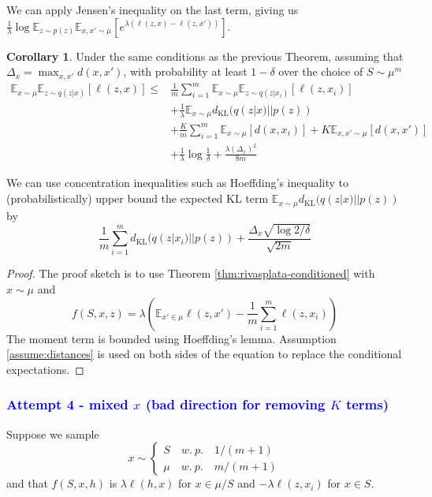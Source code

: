 \documentclass[letterpaper]{article}
\theoremstyle{definition}
\newtheorem{corollary}{Corollary}
\newcommand{\LF}[1]{{\textcolor{blue}{#1}}}
\begin{document}
We can apply Jensen's inequality on the last term, giving us $\frac{1}{\lambda}\log \mathbb{E}_{z\sim p(z)}\mathbb{E}_{x,x'\sim \mu}\left [e^{\lambda(\ell(z,x)-\ell(z,x'))}\right ]$.

\begin{corollary}
    Under the same conditions as the previous Theorem, assuming that $\Delta_x=\max_{x,x'}d(x,x')$, with probability at least $1-\delta$ over the choice of $S\sim \mu^m$
    \begin{equation}
\begin{split}
    \mathbb{E}_{x\sim \mu}\mathbb{E}_{z\sim q(z|x)}\left [\ell(z,x) \right ]\leq &\frac{1}{m}\sum_{i=1}^{m}\mathbb{E}_{x\sim \mu}\mathbb{E}_{z\sim q(z|x_i)}\left [\ell(z,x_{i}) \right ]\\
    &+ \frac{1}{\lambda}\mathbb{E}_{x\sim \mu}d_{\mathrm{KL}}(q(z|x)||p(z)) \\
    & + \frac{K}{m}\sum_{i=1}^{m}\mathbb{E}_{x\sim \mu}\left [d(x,x_i) \right ]+ K\mathbb{E}_{x,x'\sim \mu}\left [d(x,x') \right ]\\ &+\frac{1}{\lambda}\log\frac{1}{\delta} 
    + \frac{\lambda (\Delta_x)^2}{8m}
\end{split}
\end{equation}
\end{corollary}

We can use concentration inequalities such as Hoeffding's inequality to (probabilistically) upper bound the expected KL term $\mathbb{E}_{x\sim \mu}d_{\mathrm{KL}}(q(z|x)||p(z))$ by $$\frac{1}{m}\sum_{i=1}^{m}d_{\mathrm{KL}}(q(z|x_i)||p(z))+\frac{\Delta_x\sqrt{\log2/\delta}}{\sqrt{2m}}$$

\begin{proof}
    The proof sketch is to use Theorem \ref{thm:rivasplata-conditioned} with $x\sim \mu$ and $$f(S,x,z)=\lambda\left (\mathbb{E}_{x'\in \mu}\ell(z,x')-\frac{1}{m}\sum_{i=1}^{m}\ell(z,x_i)\right )$$
    The moment term is bounded using Hoeffding's lemma.
    Assumption \ref{assume:distances} is used on both sides of the equation to replace the conditional expectations.
\end{proof}

\LF{\subsubsection{Attempt 4 - mixed $x$ (bad direction for removing $K$ terms)}}
Suppose we sample $$x\sim \begin{cases}
S \quad w.\ p.\quad 1/(m+1)\\
\mu \quad w.\ p.\quad m/(m+1)
\end{cases}$$ and that $f(S,x,h)$ is $\lambda\ell(h,x)$ for $x\in \mu/S$ and $-\lambda\ell(z,x_i)$ for $x\in S$.
\end{document}
